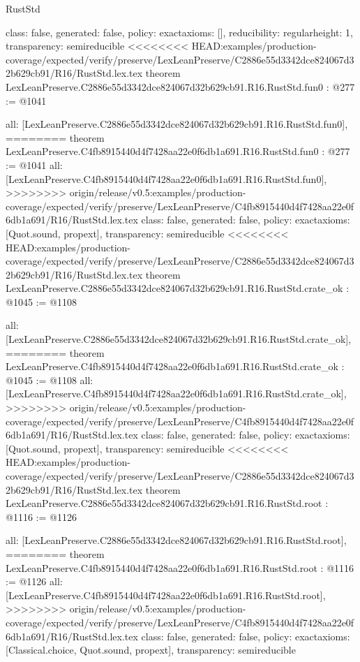 \begin{lexlean}{RustStd}
\begin{coremodule}
{\begin{coremodule}
{{{  class: false,
  generated: false,
  policy: exact{axioms: []},
  reducibility: regular{height: 1},
  transparency: semireducible
}
<<<<<<<< HEAD:examples/production-coverage/expected/verify/preserve/LexLeanPreserve/C2886e55d3342dce824067d32b629cb91/R16/RustStd.lex.tex
theorem LexLeanPreserve.C2886e55d3342dce824067d32b629cb91.R16.RustStd.fun0 : @277 := @1041 {
  all: [LexLeanPreserve.C2886e55d3342dce824067d32b629cb91.R16.RustStd.fun0],
========
theorem LexLeanPreserve.C4fb8915440d4f7428aa22e0f6db1a691.R16.RustStd.fun0 : @277 := @1041 {
  all: [LexLeanPreserve.C4fb8915440d4f7428aa22e0f6db1a691.R16.RustStd.fun0],
>>>>>>>> origin/release/v0.5:examples/production-coverage/expected/verify/preserve/LexLeanPreserve/C4fb8915440d4f7428aa22e0f6db1a691/R16/RustStd.lex.tex
  class: false,
  generated: false,
  policy: exact{axioms: [Quot.sound, propext]},
  transparency: semireducible
}
<<<<<<<< HEAD:examples/production-coverage/expected/verify/preserve/LexLeanPreserve/C2886e55d3342dce824067d32b629cb91/R16/RustStd.lex.tex
theorem LexLeanPreserve.C2886e55d3342dce824067d32b629cb91.R16.RustStd.crate_ok : @1045 := @1108 {
  all: [LexLeanPreserve.C2886e55d3342dce824067d32b629cb91.R16.RustStd.crate_ok],
========
theorem LexLeanPreserve.C4fb8915440d4f7428aa22e0f6db1a691.R16.RustStd.crate_ok : @1045 := @1108 {
  all: [LexLeanPreserve.C4fb8915440d4f7428aa22e0f6db1a691.R16.RustStd.crate_ok],
>>>>>>>> origin/release/v0.5:examples/production-coverage/expected/verify/preserve/LexLeanPreserve/C4fb8915440d4f7428aa22e0f6db1a691/R16/RustStd.lex.tex
  class: false,
  generated: false,
  policy: exact{axioms: [Quot.sound, propext]},
  transparency: semireducible
}
<<<<<<<< HEAD:examples/production-coverage/expected/verify/preserve/LexLeanPreserve/C2886e55d3342dce824067d32b629cb91/R16/RustStd.lex.tex
theorem LexLeanPreserve.C2886e55d3342dce824067d32b629cb91.R16.RustStd.root : @1116 := @1126 {
  all: [LexLeanPreserve.C2886e55d3342dce824067d32b629cb91.R16.RustStd.root],
========
theorem LexLeanPreserve.C4fb8915440d4f7428aa22e0f6db1a691.R16.RustStd.root : @1116 := @1126 {
  all: [LexLeanPreserve.C4fb8915440d4f7428aa22e0f6db1a691.R16.RustStd.root],
>>>>>>>> origin/release/v0.5:examples/production-coverage/expected/verify/preserve/LexLeanPreserve/C4fb8915440d4f7428aa22e0f6db1a691/R16/RustStd.lex.tex
  class: false,
  generated: false,
  policy: exact{axioms: [Classical.choice, Quot.sound, propext]},
  transparency: semireducible
}

}}}}}
\end{coremodule}}
\end{coremodule}
\end{lexlean}
